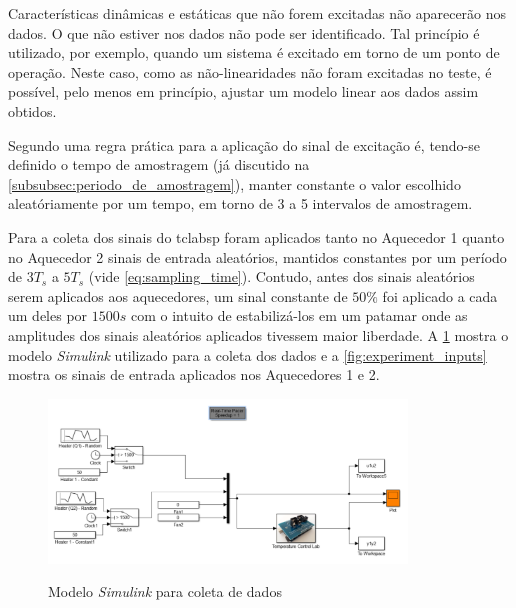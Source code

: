 \begin{citacao}
    Características dinâmicas e estáticas que não forem excitadas não aparecerão nos dados. O que
    não estiver nos dados não pode ser identificado. Tal princípio é utilizado, por exemplo,
    quando um sistema é excitado em torno de um ponto de operação. Neste caso, como as não-linearidades
    não foram excitadas no teste, é possível, pelo menos em princípio, ajustar um modelo linear
    aos dados assim obtidos. \cite{Aguirre2015}
\end{citacao}

Segundo  uma regra prática para a aplicação do sinal de excitação é,
tendo-se definido o tempo de amostragem (já discutido na \cref{subsubsec:periodo_de_amostragem}),
manter constante o valor escolhido aleatóriamente por um tempo, em torno de 3 a 5 intervalos de
amostragem.

Para a coleta dos sinais do \acrshort{tclabsp} foram aplicados tanto no Aquecedor 1 quanto no
Aquecedor 2 sinais de entrada aleatórios, mantidos constantes por um período de $3T_s$ a $5T_s$
(vide \cref{eq:sampling_time}). Contudo, antes dos sinais aleatórios serem aplicados aos
aquecedores, um sinal constante de $50\%$ foi aplicado a cada um deles por $1500s$ com o intuito
de estabilizá-los em um patamar onde as amplitudes dos sinais aleatórios aplicados tivessem
maior liberdade. A \cref{fig:simulink_coleta} mostra o modelo \textit{Simulink} utilizado para
a coleta dos dados e a \cref{fig:experiment_inputs} mostra os sinais de entrada aplicados nos
Aquecedores 1 e 2.

\begin{figure}[h]
	\caption{Modelo \textit{Simulink} para coleta de dados}
	\begin{center}
		\includegraphics[width=0.85\textwidth]{./5_images/SimulinkColeta.png} 
		\label{fig:simulink_coleta}
	\end{center}
	\centering
\end{figure}

